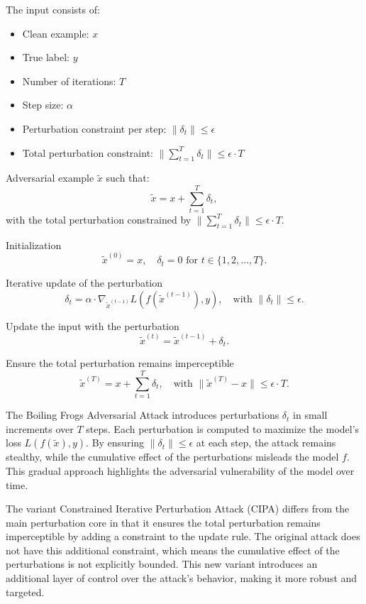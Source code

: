 The input consists of:
\begin{itemize}
    \item Clean example: \( x \)
    \item True label: \( y \)
    \item Number of iterations: \( T \)
    \item Step size: \( \alpha \)
    \item Perturbation constraint per step: \( \|\delta_t\| \leq \epsilon \)
    \item Total perturbation constraint: \( \|\sum_{t=1}^{T} \delta_t\| \leq \epsilon \cdot T \)
\end{itemize}

Adversarial example $\tilde{x}$ such that:
\[
\tilde{x} = x + \sum_{t=1}^T \delta_t,
\]
with the total perturbation constrained by \( \|\sum_{t=1}^T \delta_t\| \leq \epsilon \cdot T \).

Initialization
   \[
   \tilde{x}^{(0)} = x, \quad \delta_t = 0 \text{ for } t \in \{1, 2, \ldots, T\}.
   \]

Iterative update of the perturbation
   \[
   \delta_t = \alpha \cdot \nabla_{\tilde{x}^{(t-1)}} L(f(\tilde{x}^{(t-1)}), y), \quad \text{with } \|\delta_t\| \leq \epsilon.
   \]

Update the input with the perturbation
   \[
   \tilde{x}^{(t)} = \tilde{x}^{(t-1)} + \delta_t.
   \]

Ensure the total perturbation remains imperceptible
   \[
   \tilde{x}^{(T)} = x + \sum_{t=1}^T \delta_t, \quad \text{with } \|\tilde{x}^{(T)} - x\| \leq \epsilon \cdot T.
   \]

The Boiling Frogs Adversarial Attack introduces perturbations \( \delta_t \) in small increments over \( T \) steps. Each perturbation is computed to maximize the model's loss \( L(f(\tilde{x}), y) \). By ensuring \( \|\delta_t\| \leq \epsilon \) at each step, the attack remains stealthy, while the cumulative effect of the perturbations misleads the model $f$. This gradual approach highlights the adversarial vulnerability of the model over time.

The variant Constrained Iterative Perturbation Attack (CIPA) differs from the main perturbation core in that it ensures the total perturbation remains imperceptible by adding a constraint to the update rule. The original attack does not have this additional constraint, which means the cumulative effect of the perturbations is not explicitly bounded. This new variant introduces an additional layer of control over the attack's behavior, making it more robust and targeted.